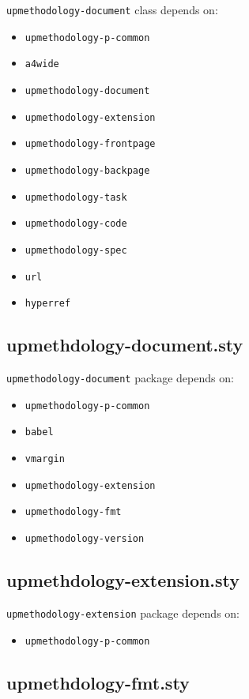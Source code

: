 \documentclass[book]{upmethodology-document}
\begin{document}
\texttt{upmethodology-document} class depends on:
\begin{itemize}
\item \texttt{upmethodology-p-common}
\item \texttt{a4wide}
\item \texttt{upmethodology-document}
\item \texttt{upmethodology-extension}
\item \texttt{upmethodology-frontpage}
\item \texttt{upmethodology-backpage}
\item \texttt{upmethodology-task}
\item \texttt{upmethodology-code}
\item \texttt{upmethodology-spec}
\item \texttt{url}
\item \texttt{hyperref}
\end{itemize}

\subsection{upmethdology-document.sty}

\texttt{upmethodology-document} package depends on:
\begin{itemize}
\item \texttt{upmethodology-p-common}
\item \texttt{babel}
\item \texttt{vmargin}
\item \texttt{upmethodology-extension}
\item \texttt{upmethodology-fmt}
\item \texttt{upmethodology-version}
\end{itemize}

\subsection{upmethdology-extension.sty}

\texttt{upmethodology-extension} package depends on:
\begin{itemize}
\item \texttt{upmethodology-p-common}
\end{itemize}

\subsection{upmethdology-fmt.sty}
\end{document}
